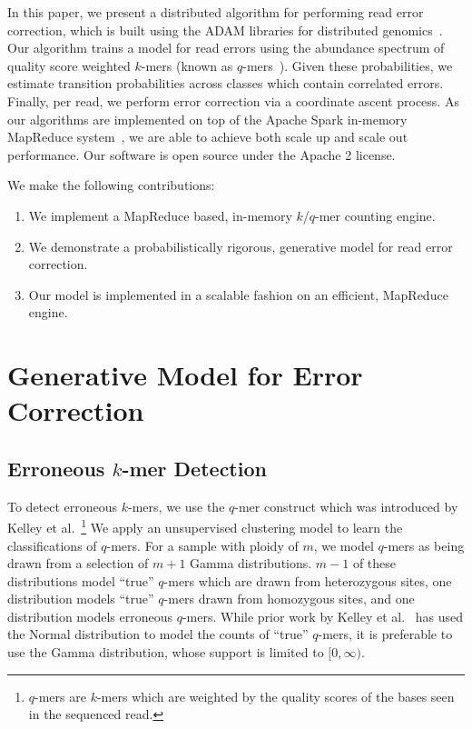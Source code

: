 \documentclass{llncs}
\begin{document}
In this paper, we present a distributed algorithm for performing read error correction, which is built using
the ADAM libraries for distributed genomics~\cite{massie13}. Our algorithm trains a model for read errors
using the abundance spectrum of quality score weighted $k$-mers (known as $q$-mers~\cite{kelley10}).
Given these probabilities, we estimate transition probabilities across classes which contain correlated
errors. Finally, per read, we perform error correction via a coordinate ascent process. As our algorithms
are implemented on top of the Apache Spark in-memory MapReduce system~\cite{zaharia10}, we are
able to achieve both scale up and scale out performance. Our software is open source under the Apache
2 license.

We make the following contributions:

\begin{enumerate}
\item We implement a MapReduce based, in-memory $k$/$q$-mer counting engine.
\item We demonstrate a probabilistically rigorous, generative model for read error correction.
\item Our model is implemented in a scalable fashion on an efficient, MapReduce engine.
\end{enumerate}

\section{Generative Model for Error Correction}
\label{sec:generative-model}

\subsection{Erroneous $k$-mer Detection}
\label{sec:detection}

To detect erroneous $k$-mers, we use the $q$-mer construct which was introduced by Kelley et
al.~\cite{kelley10}\footnote{$q$-mers are $k$-mers which are weighted by the quality scores of the
bases seen in the sequenced read.} We apply an unsupervised clustering model to learn the
classifications of $q$-mers. For a sample with ploidy of $m$, we model $q$-mers as being drawn from a
selection of $m + 1$ Gamma distributions. $m - 1$ of these distributions model ``true'' $q$-mers which are
drawn from heterozygous sites, one distribution models ``true'' $q$-mers drawn from homozygous sites,
and one distribution models erroneous $q$-mers. While prior work by Kelley et al.~\cite{kelley10} has
used the Normal distribution to model the counts of ``true'' $q$-mers, it is preferable to use the Gamma
distribution, whose support is limited to $[0, \infty)$.
\end{document}
